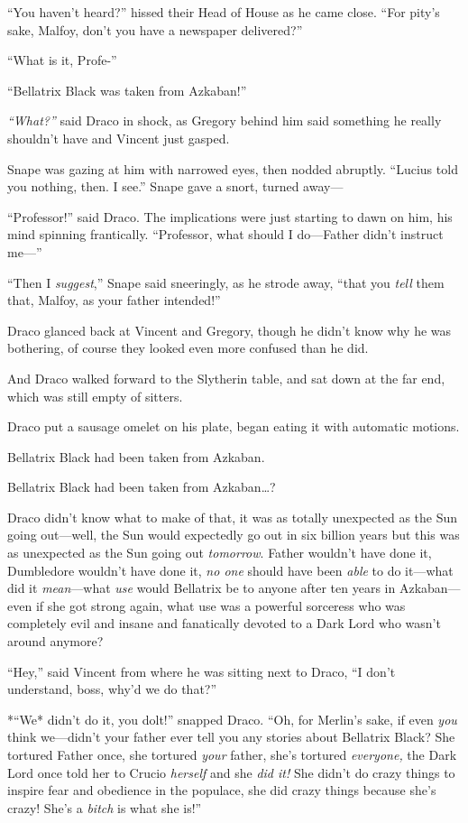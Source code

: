 ``You haven't heard?'' hissed their Head of House as he came close.
``For pity's sake, Malfoy, don't you have a newspaper delivered?''

``What is it, Profe-''

``Bellatrix Black was taken from Azkaban!''

\emph{``What?''} said Draco in shock, as Gregory behind him said
something he really shouldn't have and Vincent just gasped.

Snape was gazing at him with narrowed eyes, then nodded abruptly.
``Lucius told you nothing, then. I see.'' Snape gave a snort, turned
away---

``Professor!'' said Draco. The implications were just starting to dawn
on him, his mind spinning frantically. ``Professor, what should I
do---Father didn't instruct me---''

``Then I \emph{suggest},'' Snape said sneeringly, as he strode away,
``that you \emph{tell} them that, Malfoy, as your father intended!''

Draco glanced back at Vincent and Gregory, though he didn't know why he
was bothering, of course they looked even more confused than he did.

And Draco walked forward to the Slytherin table, and sat down at the far
end, which was still empty of sitters.

Draco put a sausage omelet on his plate, began eating it with automatic
motions.

Bellatrix Black had been taken from Azkaban.

Bellatrix Black had been taken from Azkaban\ldots{}?

Draco didn't know what to make of that, it was as totally unexpected as
the Sun going out---well, the Sun would expectedly go out in six billion
years but this was as unexpected as the Sun going out \emph{tomorrow}.
Father wouldn't have done it, Dumbledore wouldn't have done it, \emph{no
one} should have been \emph{able} to do it---what did it
\emph{mean}---what \emph{use} would Bellatrix be to anyone after ten
years in Azkaban---even if she got strong again, what use was a powerful
sorceress who was completely evil and insane and fanatically devoted to
a Dark Lord who wasn't around anymore?

``Hey,'' said Vincent from where he was sitting next to Draco, ``I don't
understand, boss, why'd we do that?''

*``We* didn't do it, you dolt!'' snapped Draco. ``Oh, for Merlin's sake,
if even \emph{you} think we---didn't your father ever tell you any
stories about Bellatrix Black? She tortured Father once, she tortured
\emph{your} father, she's tortured \emph{everyone,} the Dark Lord once
told her to Crucio \emph{herself} and she \emph{did it!} She didn't do
crazy things to inspire fear and obedience in the populace, she did
crazy things because she's crazy! She's a \emph{bitch} is what she is!''

